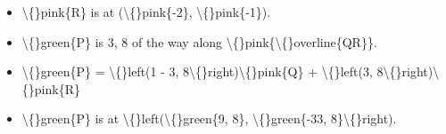 \documentclass{article}
\begin{document}
\begin{itemize}
  \item \textbackslash\{\}pink\{R\} is at (\textbackslash\{\}pink\{-2\}, \textbackslash\{\}pink\{-1\}).
  \item \textbackslash\{\}green\{P\} is 3, 8 of the way along \textbackslash\{\}pink\{\textbackslash\{\}overline\{QR\}\}.
  \item \textbackslash\{\}green\{P\} = \textbackslash\{\}left(1 - 3, 8\textbackslash\{\}right)\textbackslash\{\}pink\{Q\} + \textbackslash\{\}left(3, 8\textbackslash\{\}right)\textbackslash\{\}pink\{R\}
  \item \textbackslash\{\}green\{P\} is at \textbackslash\{\}left(\textbackslash\{\}green\{9, 8\}, \textbackslash\{\}green\{-33, 8\}\textbackslash\{\}right).
\end{itemize}
\end{document}
